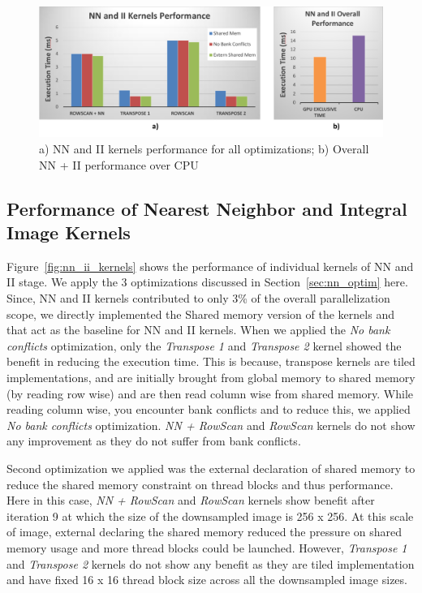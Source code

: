 \vspace{0.2in}
\begin{figure}[h]
  \centering
  \includegraphics[width=0.9\linewidth]{figs/nn_ii_overall_crop.pdf}
  \caption{a) NN and II kernels performance for all optimizations; b) Overall NN + II performance over CPU}
  \label{fig:nn_ii_overall}
\end{figure}

\subsection{Performance of Nearest Neighbor and Integral Image Kernels}
Figure~\ref{fig:nn_ii_kernels} shows the performance of individual kernels of NN and II stage.
We apply the 3 optimizations discussed in Section~\ref{sec:nn_optim} here. Since, NN and II kernels 
contributed to only 3\% of the overall parallelization scope, we directly implemented the Shared memory version of the kernels
and that act as the baseline for NN and II kernels. When we applied the \emph{No bank conflicts} optimization, only the \emph{Transpose 1}
and \emph{Transpose 2} kernel showed the benefit in reducing the execution time. This is because, transpose kernels are tiled implementations, 
and are initially brought from global memory to shared memory (by reading row wise) and are then read column wise from shared memory. While reading column wise, 
you encounter bank conflicts and to reduce this, we applied \emph{No bank conflicts} optimization. \emph{NN + RowScan} and \emph{RowScan} kernels do not show 
any improvement as they do not suffer from bank conflicts. 

Second optimization we applied was the external declaration of shared memory
to reduce the shared memory constraint on thread blocks and thus performance. Here in this case,
\emph{NN + RowScan} and \emph{RowScan} kernels show benefit after iteration 9 at which the size of the 
downsampled image is 256 x 256. At this scale of image, external declaring the shared memory reduced the 
pressure on shared memory usage and more thread blocks could be launched. However, \emph{Transpose 1 } and 
\emph{Transpose 2} kernels do not show any benefit as they are tiled implementation and have fixed 16 x 16 thread block
size across all the downsampled image sizes. 



